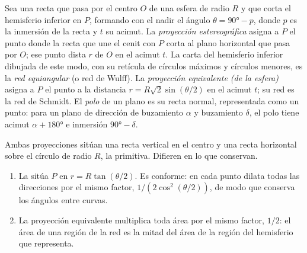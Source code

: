 \begin{definition}\label{def:b3:structural-analysis:stereo}
Sea una recta que pasa por el centro $O$ de una esfera de radio $R$ y que corta el
hemisferio inferior en $P$, formando con el nadir el ángulo $\theta = \ang{90} - p$, donde
$p$ es la inmersión de la recta y $t$ su acimut. La
\emph{proyección estereográfica} asigna a $P$ el punto donde la
recta que une el cenit con $P$ corta al plano horizontal que pasa por $O$; ese
punto dista $r$ de $O$ en el acimut $t$. La
carta del hemisferio inferior dibujada de este modo, con su retícula de círculos máximos y
círculos menores, es la \emph{red equiangular} (o
red de Wulff). La \emph{proyección equivalente (de la esfera)}
asigna a $P$ el punto a la distancia $r =
R\sqrt2\sin(\theta/2)$ en el acimut $t$; su red es la red de Schmidt. El
\emph{polo} de un plano es su recta normal, representada como
un punto: para un plano de dirección de buzamiento $\alpha$ y buzamiento $\delta$, el polo
tiene acimut $\alpha + \ang{180}$ e inmersión $\ang{90} - \delta$.
\end{definition}

Ambas proyecciones sitúan una recta vertical en el centro y una recta horizontal sobre
el círculo de radio $R$, la primitiva. Difieren en lo que conservan.

\begin{theorem}\label{thm:b3:structural-analysis:projections}
\begin{enumerate}[label=(\alph*)]
  \item La  sitúa $P$ en $r = R\tan(\theta/2)$. Es
        conforme: en cada punto dilata todas las direcciones por el mismo
        factor, $1/(2\cos^2(\theta/2))$, de modo que conserva los ángulos entre
        curvas.
  \item La proyección equivalente multiplica toda área por el mismo factor,
        $1/2$: el área de una región de la red es la mitad del área de la región
        del hemisferio que representa.
\end{enumerate}
\end{theorem}

